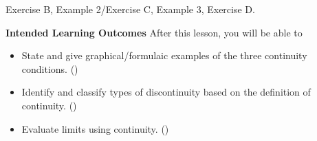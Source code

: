\documentclass[10pt]{article}
\begin{document}
\core Exercise B, Example 2/Exercise C, Example 3, Exercise D.


\newpage


\textbf{Intended Learning Outcomes}
After this lesson, you will be able to 

\begin{itemize}
    \item State and give graphical/formulaic examples of the three continuity conditions. ()
    \item Identify and classify types of discontinuity based on the definition of continuity. ()
    \item Evaluate limits using continuity. ()
\end{itemize}

\vspace{-0.5cm}

\hrulefill

\vspace{0.3cm}
\end{document}
